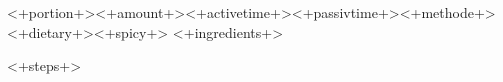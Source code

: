 \begin{recipe}{<+portion+>}{<+amount+>}{<+activetime+>}{<+passivtime+>}{<+methode+>}{<+dietary+>}{<+spicy+>}
	\label{<+recipename+>}
	<+ingredients+>
	
	\steps
	<+steps+>
\end{recipe}
